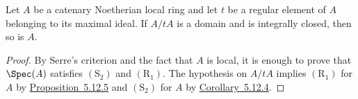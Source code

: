\begin{corollary}[5.12.7]
\label{IV.5.12.7}
Let $A$ be a catenary Noetherian local ring and let $t$ be a
regular element of $A$ belonging to its maximal ideal.  If
$A/tA$ is a domain and is integrally closed, then so is $A$.
\end{corollary}

\begin{proof}
By Serre's criterion  and the fact that $A$ is
local, it is enough to prove that $\Spec(A)$ satisfies
$(\mathrm S_2)$ and $(\mathrm R_1)$.  The hypothesis on $A/tA$
implies $(\mathrm R_1)$ for $A$ by {\hyperlink{ega4.c04.prop.5-12-5}{Proposition~5.12.5}} and
$(\mathrm S_2)$ for $A$ by {\hyperlink{ega4.c04.cor.5-12-4}{Corollary~5.12.4}}.
\end{proof}
